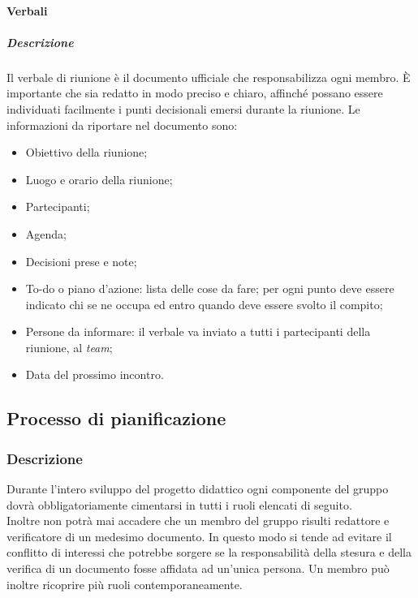 \paragraph{Verbali}
\subparagraph{Descrizione}
Il verbale di riunione è il documento ufficiale che responsabilizza ogni membro.
È importante che sia redatto in modo preciso e chiaro, affinché possano essere individuati facilmente i punti decisionali emersi durante la riunione.
Le informazioni da riportare nel documento sono:
\begin{itemize}
\item
Obiettivo della riunione;
\item
Luogo e orario della riunione;
\item
Partecipanti;
\item
Agenda;
\item
Decisioni prese e note;
\item
To-do o piano d'azione: lista delle cose da fare; per ogni punto deve essere indicato chi se ne occupa ed entro quando deve essere svolto il compito;
\item
Persone da informare: il verbale va inviato a tutti i partecipanti della riunione, al \textit{team};
\item
Data del prossimo incontro.
\end{itemize}

\subsection{Processo di pianificazione}

\subsubsection{Descrizione}
Durante l'intero sviluppo del progetto didattico ogni componente del gruppo 
dovrà obbligatoriamente cimentarsi in tutti i ruoli elencati di seguito. \\
Inoltre non potrà mai accadere che un membro del gruppo risulti redattore e verificatore di un medesimo documento. 
In questo modo si tende ad evitare il conflitto di interessi che potrebbe sorgere se la responsabilità della stesura 
e della verifica di un documento fosse affidata ad un'unica persona.
Un membro può inoltre ricoprire più ruoli contemporaneamente.

